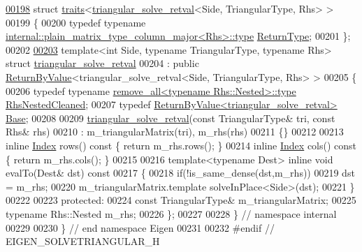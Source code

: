 \begin{DoxyCode}
\hyperlink{struct_eigen_1_1internal_1_1traits_3_01triangular__solve__retval_3_01_side_00_01_triangular_type_00_01_rhs_01_4_01_4}{00198} \textcolor{keyword}{struct }\hyperlink{struct_eigen_1_1internal_1_1traits}{traits}<\hyperlink{struct_eigen_1_1internal_1_1triangular__solve__retval}{triangular\_solve\_retval}<Side, TriangularType, Rhs> >
00199 \{
00200   \textcolor{keyword}{typedef} \textcolor{keyword}{typename} \hyperlink{group___core___module_class_eigen_1_1_matrix}{internal::plain\_matrix\_type\_column\_major<Rhs>::type}
       \hyperlink{group___core___module_class_eigen_1_1_matrix}{ReturnType};
00201 \};
00202 
\hyperlink{struct_eigen_1_1internal_1_1triangular__solve__retval}{00203} \textcolor{keyword}{template}<\textcolor{keywordtype}{int} S\textcolor{keywordtype}{id}e, \textcolor{keyword}{typename} TriangularType, \textcolor{keyword}{typename} Rhs> \textcolor{keyword}{struct }
      \hyperlink{struct_eigen_1_1internal_1_1triangular__solve__retval}{triangular\_solve\_retval}
00204  : \textcolor{keyword}{public} \hyperlink{group___core___module_class_eigen_1_1_return_by_value}{ReturnByValue}<triangular\_solve\_retval<Side, TriangularType, Rhs> >
00205 \{
00206   \textcolor{keyword}{typedef} \textcolor{keyword}{typename} \hyperlink{group___sparse_core___module}{remove\_all<typename Rhs::Nested>::type} 
      \hyperlink{group___sparse_core___module}{RhsNestedCleaned};
00207   \textcolor{keyword}{typedef} \hyperlink{group___core___module_class_eigen_1_1_return_by_value}{ReturnByValue<triangular\_solve\_retval>} 
      \hyperlink{group___core___module_class_eigen_1_1_return_by_value}{Base};
00208 
00209   \hyperlink{struct_eigen_1_1internal_1_1triangular__solve__retval}{triangular\_solve\_retval}(\textcolor{keyword}{const} TriangularType& tri, \textcolor{keyword}{const} Rhs& rhs)
00210     : m\_triangularMatrix(tri), m\_rhs(rhs)
00211   \{\}
00212 
00213   \textcolor{keyword}{inline} \hyperlink{namespace_eigen_a62e77e0933482dafde8fe197d9a2cfde}{Index} rows()\textcolor{keyword}{ const }\{ \textcolor{keywordflow}{return} m\_rhs.rows(); \}
00214   \textcolor{keyword}{inline} \hyperlink{namespace_eigen_a62e77e0933482dafde8fe197d9a2cfde}{Index} cols()\textcolor{keyword}{ const }\{ \textcolor{keywordflow}{return} m\_rhs.cols(); \}
00215 
00216   \textcolor{keyword}{template}<\textcolor{keyword}{typename} Dest> \textcolor{keyword}{inline} \textcolor{keywordtype}{void} evalTo(Dest& dst)\textcolor{keyword}{ const}
00217 \textcolor{keyword}{  }\{
00218     \textcolor{keywordflow}{if}(!is\_same\_dense(dst,m\_rhs))
00219       dst = m\_rhs;
00220     m\_triangularMatrix.template solveInPlace<Side>(dst);
00221   \}
00222 
00223   \textcolor{keyword}{protected}:
00224     \textcolor{keyword}{const} TriangularType& m\_triangularMatrix;
00225     \textcolor{keyword}{typename} Rhs::Nested m\_rhs;
00226 \};
00227 
00228 \} \textcolor{comment}{// namespace internal}
00229 
00230 \} \textcolor{comment}{// end namespace Eigen}
00231 
00232 \textcolor{preprocessor}{#endif // EIGEN\_SOLVETRIANGULAR\_H}
\end{DoxyCode}
